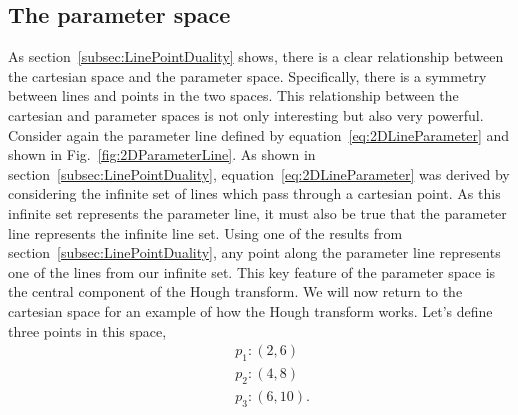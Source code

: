 \subsection{The parameter space}
\label{subsec:ParameterSpace}
As section~\ref{subsec:LinePointDuality} shows, there is a clear relationship between the cartesian space and the parameter space.  Specifically, there is a symmetry between lines and points in the two spaces.  This relationship between the cartesian and parameter spaces is not only interesting but also very powerful.  Consider again the parameter line defined by equation~\ref{eq:2DLineParameter} and shown in Fig.~\ref{fig:2DParameterLine}.  As shown in section~\ref{subsec:LinePointDuality}, equation~\ref{eq:2DLineParameter} was derived by considering the infinite set of lines which pass through a cartesian point.  As this infinite set represents the parameter line, it must also be true that the parameter line represents the infinite line set.  Using one of the results from section~\ref{subsec:LinePointDuality}, any point along the parameter line represents one of the lines from our infinite set.  This key feature of the parameter space is the central component of the Hough transform.  
\newline
We will now return to the cartesian space for an example of how the Hough transform works.  Let's define three points in this space,
\begin{equation}
  \begin{split}
    &\quad p_{1}: (2,6) \\
    &\quad p_{2}: (4,8) \\
    &\quad p_{3}: (6,10).
  \end{split}
  \label{eq:HTExampleCartesianPoints}
\end{equation}

